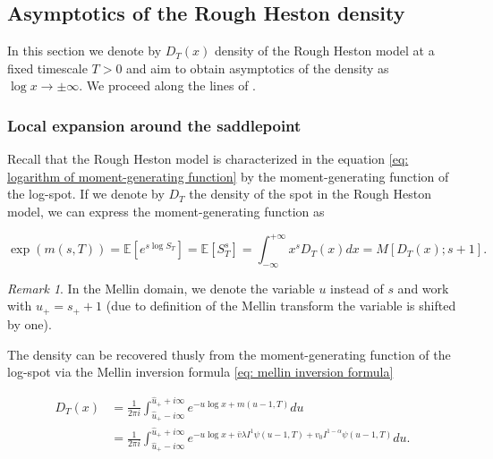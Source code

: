 \documentclass[12pt,twoside]{article}
\theoremstyle{plain}
\theoremstyle{plain}
\theoremstyle{definition}
\theoremstyle{remark}
\newtheorem{remark}[proposition]{Remark}
\numberwithin{equation}{section}
\begin{document}
\subsection{Asymptotics of the Rough Heston density}
\label{sec: saddlepoint asymptotics of the rough heston density}

In this section we denote by $D_T(x)$ density of the Rough Heston model at a fixed timescale $T>0$ and aim to obtain asymptotics of the density as $\log x \rightarrow \pm \infty$. We proceed along the lines of \cite{FGGS10}.

\subsubsection{Local expansion around the saddlepoint}

Recall that the Rough Heston model is characterized in the equation \eqref{eq: logarithm of moment-generating function} by the moment-generating function of the log-spot. If we denote by $D_T$ the density of the spot in the Rough Heston model, we can express the moment-generating function as

$$
\exp(m(s, T)) = \mathbb{E}\left[e^{s \log S_{T}}\right]=\mathbb{E}\left[S_{T}^{s}\right]=\int_{-\infty}^{+\infty} x^{s} D_{T}(x) d x=M\left[D_{T}(x); s+1\right].
$$

\vspace{10pt}

\begin{remark}
In the Mellin domain, we denote the variable $u$ instead of $s$ and work with $u_+ = s_+ +1$ (due to definition of the Mellin transform the variable is shifted by one).
\end{remark}

The density can be recovered thusly from the moment-generating function of the log-spot via the Mellin inversion formula \eqref{eq: mellin inversion formula}

\begin{equation}
\label{eq: rough heston density}
\begin{aligned}
D_{T}(x)&=\frac{1}{2 \pi i} \int_{{\hat u_+}-i \infty}^{\hat u_++i \infty} e^{-u \log x + m(u-1, T)} d u \\[10pt]
&=\frac{1}{2 \pi i} \int_{{\hat u_+}-i \infty}^{\hat u_+ +i \infty} e^{-u \log x +\bar{v} \lambda I^{1} \psi(u-1, T)+v_{0} I^{1-\alpha} \psi(u-1, T)} d u.
\end{aligned}
\end{equation}
\end{document}
